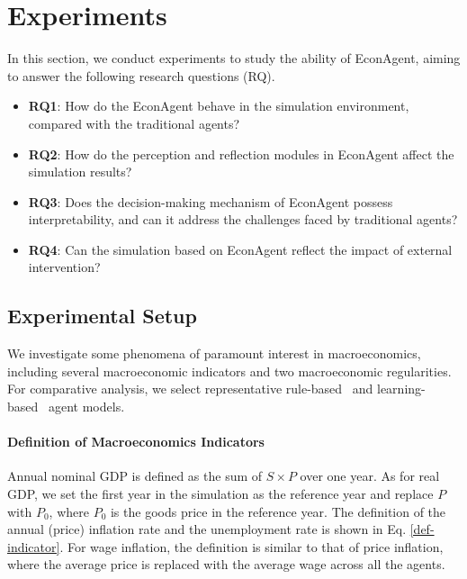 
\section{Experiments}\label{sec::exp}
In this section, we conduct experiments to study the ability of EconAgent, aiming to answer the following research questions (RQ).
\begin{itemize}[leftmargin=*]
    \item \textbf{RQ1}: How do the EconAgent behave in the simulation environment, compared with the traditional agents?
    \item \textbf{RQ2}: How do the perception and reflection modules in EconAgent affect the simulation results?
    \item \textbf{RQ3}: Does the decision-making mechanism of EconAgent possess interpretability, and can it address the challenges faced by traditional agents?
    \item \textbf{RQ4}: Can the simulation based on EconAgent reflect the impact of external intervention?
\end{itemize}


\subsection{Experimental Setup}
We investigate some phenomena of paramount interest in macroeconomics, including several macroeconomic indicators and two macroeconomic regularities. 
For comparative analysis, we select representative rule-based~\cite{lengnick2013agent,gatti2011macroeconomics} and learning-based~\cite{zheng2022ai} agent models.

\paragraph{Definition of Macroeconomics Indicators} Annual nominal GDP is defined as the sum of $S\times P$ over one year. As for real GDP, we set the first year in the simulation as the reference year and replace $P$ with $P_0$, where $P_0$ is the goods price in the reference year. The definition of the annual (price) inflation rate and the unemployment rate is shown in Eq. \ref{def-indicator}. For wage inflation, the definition is similar to that of price inflation, where the average price is replaced with the average wage across all the agents.


